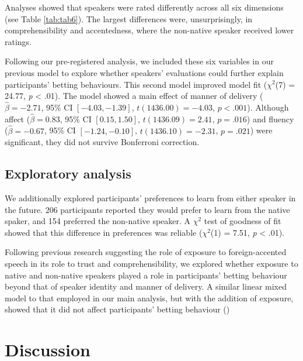 \documentclass[
  man,floatsintext]{apa7}
\begin{document}
Analyses showed that speakers were rated differently across all six dimensions (see Table \ref{tab:tab6}). The largest differences were, unsurprisingly, in comprehensibility and accentedness, where the non-native speaker received lower ratings.

Following our pre-registered analysis, we included these six variables in our previous model to explore whether speakers' evaluations could further explain participants' betting behaviours. This second model improved model fit (\(\chi^2\)(7) = 24.77, \emph{p} \textless{} .01). The model showed a main effect of manner of delivery (\(\hat{\beta} = -2.71\), 95\% CI \([-4.03, -1.39]\), \(t(1436.00) = -4.03\), \(p < .001\)). Although affect (\(\hat{\beta} = 0.83\), 95\% CI \([0.15, 1.50]\), \(t(1436.09) = 2.41\), \(p = .016\)) and fluency (\(\hat{\beta} = -0.67\), 95\% CI \([-1.24, -0.10]\), \(t(1436.10) = -2.31\), \(p = .021\)) were significant, they did not survive Bonferroni correction.

\hypertarget{exploratory-analysis}{%
\subsection{Exploratory analysis}\label{exploratory-analysis}}

We additionally explored participants' preferences to learn from either speaker in the future. 206 participants reported they would prefer to learn from the native spaker, and 154 preferred the non-native speaker. A \(\chi^2\) test of goodness of fit showed that this difference in preferences was reliable (\(\chi^2\)(1) = 7.51, \emph{p} \textless{} .01).

Following previous research suggesting the role of exposure to foreign-accented speech in its role to trust and comprehensibility, we explored whether exposure to native and non-native speakers played a role in participants' betting behaviour beyond that of speaker identity and manner of delivery. A similar linear mixed model to that employed in our main analysis, but with the addition of exposure, showed that it did not affect participants' betting behaviour ()

\hypertarget{discussion}{%
\section{Discussion}\label{discussion}}
\end{document}
